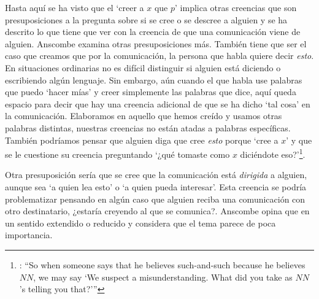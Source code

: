 Hasta aquí se ha visto que el `creer a $x$ que $p$' implica otras creencias que son presuposiciones a la pregunta sobre si se cree o se descree a alguien y se ha descrito lo que tiene que ver con la creencia de que una comunicación viene de alguien. Anscombe examina otras presuposiciones más. También tiene que ser el caso que creamos que por la comunicación, la persona que habla quiere decir \emph{esto}. En situaciones ordinarias no es difícil distinguir si alguien está diciendo o escribiendo algún lenguaje. Sin embargo, aún cuando el que habla use palabras que puedo `hacer mías' y creer simplemente las palabras que dice, aquí queda espacio para decir que hay una creencia adicional de que se ha dicho `tal cosa' en la comunicación. Elaboramos en aquello que hemos creído y usamos otras palabras distintas, nuestras creencias no están atadas a palabras específicas. También podríamos pensar que alguien diga que cree \emph{esto} porque `cree a $x$' y que se le cuestione su creencia preguntando \enquote*{¿qué tomaste como $x$ diciéndote eso?}\footnote{\cite[Cf.~][8]{anscombe2008faith:tobelieve}: \enquote{So when someone says that he believes such-and-such because he believes $NN$, we may say `We suspect a misunderstanding. What did you take as $NN$'s telling you that?'}}.

Otra presuposición sería que se cree que la comunicación está \emph{dirigida} a alguien, aunque sea \enquote*{a quien lea esto} o \enquote*{a quien pueda interesar}. Esta creencia se podría problematizar pensando en algún caso que alguien reciba una comunicación con otro destinatario, ¿estaría creyendo al que se comunica?. Anscombe opina que en un sentido extendido o reducido y considera que el tema parece de poca importancia.

